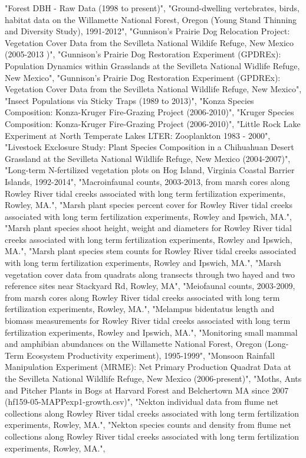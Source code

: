 \documentclass{article}\usepackage[]{graphicx}\usepackage[]{color}
\begin{document}
"Forest DBH - Raw Data (1998 to present)", "Ground-dwelling vertebrates, birds, habitat data on the Willamette National Forest, Oregon (Young Stand Thinning and Diversity Study), 1991-2012", "Gunnison's Prairie Dog Relocation Project: Vegetation Cover Data from the Sevilleta National Wildife Refuge, New Mexico (2005-2013 )", "Gunnison's Prairie Dog Restoration Experiment (GPDREx): Population Dynamics within Grasslands at the Sevilleta National Widlife Refuge, New Mexico", "Gunnison's Prairie Dog Restoration Experiment (GPDREx): Vegetation Cover Data from the Sevilleta National Wildlife Refuge, New Mexico", 
"Insect Populations via Sticky Traps (1989 to 2013)", "Konza Species Composition: Konza-Kruger Fire-Grazing Project (2006-2010)", "Kruger Species Composition: Konza-Kruger Fire-Grazing Project (2006-2010)", "Little Rock Lake Experiment at North Temperate Lakes LTER: Zooplankton 1983 - 2000", "Livestock Exclosure Study: Plant Species Composition in a Chihuahuan Desert Grassland at the Sevilleta National Wildlife Refuge, New Mexico (2004-2007)", "Long-term N-fertilized vegetation plots on Hog Island, Virginia Coastal Barrier Islands, 1992-2014", 
"Macroinfaunal counts, 2003-2013, from marsh cores along Rowley River tidal creeks associated with long term fertilization experiments, Rowley, MA.", "Marsh plant species percent cover for Rowley River tidal creeks associated with long term fertilization experiments, Rowley and Ipswich, MA.", "Marsh plant species shoot height, weight and diameters for Rowley River tidal creeks associated with long term fertilization experiments, Rowley and Ipswich, MA.", "Marsh plant species stem counts for Rowley River tidal creeks associated with long term fertilization experiments, Rowley and Ipswich, MA.", 
"Marsh vegetation cover data from quadrats along transects through two hayed and two reference sites near Stackyard Rd, Rowley, MA", "Meiofaunal counts, 2003-2009, from marsh cores along Rowley River tidal creeks associated with long term fertilization experiments, Rowley, MA.", "Melampus bidentatus length and biomass measurements for Rowley River tidal creeks associated with long term fertilization experiments, Rowley and Ipswich, MA.", "Monitoring small mammal and amphibian abundances on the Willamette National Forest, Oregon (Long-Term Ecosystem Productivity experiment), 1995-1999", 
"Monsoon Rainfall Manipulation Experiment (MRME): Net Primary Production Quadrat Data at the Sevilleta National Wildlife Refuge, New Mexico (2006-present)", "Moths, Ants and Pitcher Plants in Bogs at Harvard Forest and Belchertown MA since 2007 (hf159-05-MAPPexp1-growth.csv)", "Nekton individual data from flume net collections along Rowley River tidal creeks associated with long term fertilization experiments, Rowley, MA.", "Nekton species counts and density from flume net collections along Rowley River tidal creeks associated with long term fertilization experiments, Rowley, MA.", 
\end{document}
